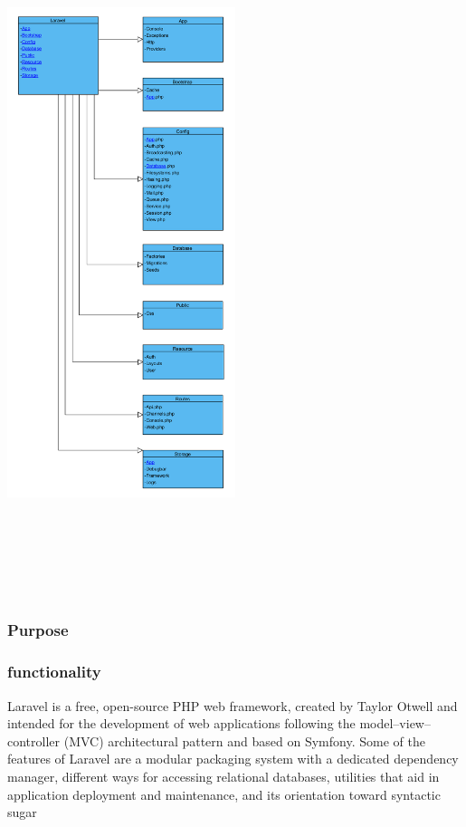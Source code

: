 \documentclass[letterpaper, 10 pt, conference]{ieeeconf}  %
\begin{document}
\begin{center}
\includegraphics[width=0.5\textwidth,height = 20cm]{bibliographies/image/Laravel.png}
\end{center}
\subsubsection{Purpose}

\subsubsection{functionality}
Laravel is a free, open-source PHP web framework, created by Taylor Otwell and intended for the development of web applications following the model–view–controller (MVC) architectural pattern and based on Symfony. Some of the features of Laravel are a modular packaging system with a dedicated dependency manager, different ways for accessing relational databases, utilities that aid in application deployment and maintenance, and its orientation toward syntactic sugar
\end{document}
